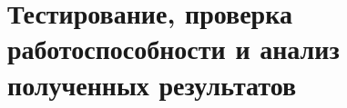 \section{Тестирование, проверка работоспособности и анализ полученных результатов}
\label{sec:testing}


